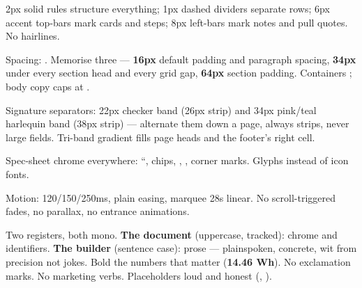 \documentclass[fontpath=fonts/,logopath=logo/]{riposte-doc}
\begin{document}

2px solid rules structure everything; 1px dashed dividers separate rows; 6px accent top-bars mark cards and steps; 8px left-bars mark notes and pull quotes. No hairlines.

Spacing: . Memorise three — \textbf{16px} default padding and paragraph spacing, \textbf{34px} under every section head and every grid gap, \textbf{64px} section padding. Containers ; body copy caps at .

Signature separators: 22px checker band (26px strip) and 34px pink/teal harlequin band (38px strip) — alternate them down a page, always strips, never large fields. Tri-band gradient  fills page heads and the footer's right cell.

Spec-sheet chrome everywhere: ``,  chips, , , corner marks. Glyphs  instead of icon fonts.

Motion: 120/150/250ms, plain easing, marquee 28s linear. No scroll-triggered fades, no parallax, no entrance animations.



Two registers, both mono. \textbf{The document} (uppercase, tracked): chrome and identifiers. \textbf{The builder} (sentence case): prose — plainspoken, concrete, wit from precision not jokes. Bold the numbers that matter (\textbf{14.46 Wh}). No exclamation marks. No marketing verbs. Placeholders loud and honest (\ripmono{\$[TAM]}, ).


\end{document}
